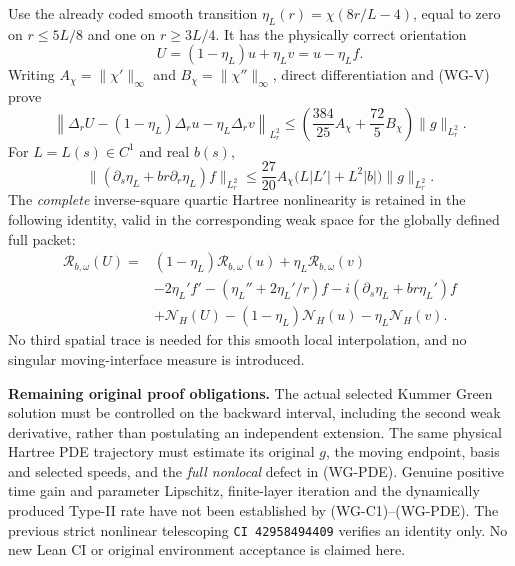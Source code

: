 Use the already coded smooth transition
$\eta_L(r)=\chi(8r/L-4)$, equal to zero on $r\le5L/8$ and one
on $r\ge3L/4$. It has the physically correct orientation
\[
 U=(1-\eta_L)u+\eta_Lv=u-\eta_Lf.
\]
Writing $A_\chi=\|\chi'\|_\infty$ and
$B_\chi=\|\chi''\|_\infty$, direct differentiation and (WG-V)
prove
\[
 \left\|\Delta_rU-(1-\eta_L)\Delta_ru-\eta_L\Delta_rv
 \right\|_{L^2_r}
 \le
 \left(\frac{384}{25}A_\chi+\frac{72}{5}B_\chi\right)
 \|g\|_{L^2_r}.
 \tag{WG-L}
\]
For $L=L(s)\in C^1$ and real $b(s)$,
\[
 \|(\partial_s\eta_L+b r\partial_r\eta_L)f\|_{L^2_r}
 \le\frac{27}{20}A_\chi
 \bigl(L|L'|+L^2|b|\bigr)\|g\|_{L^2_r}.
 \tag{WG-T}
\]
The \emph{complete} inverse-square quartic Hartree nonlinearity
is retained in the following identity, valid in the corresponding
weak space for the globally defined full packet:
\[
\begin{aligned}
 \mathcal R_{b,\omega}(U)
 ={}&(1-\eta_L)\mathcal R_{b,\omega}(u)
 +\eta_L\mathcal R_{b,\omega}(v)\\
 &-2\eta_L'f'-(\eta_L''+2\eta_L'/r)f
 -i(\partial_s\eta_L+b r\eta_L')f\\
 &+\mathcal N_H(U)-(1-\eta_L)\mathcal N_H(u)
 -\eta_L\mathcal N_H(v).
\end{aligned}
 \tag{WG-PDE}
\]
No third spatial trace is needed for this smooth local interpolation,
and no singular moving-interface measure is introduced.

\medskip
\noindent\textbf{Remaining original proof obligations.}
The actual selected Kummer Green solution must be controlled on
the backward interval, including the second weak derivative, rather
than postulating an independent extension. The same physical Hartree
PDE trajectory must estimate its original $g$, the moving endpoint,
basis and selected speeds, and the \emph{full nonlocal} defect in
(WG-PDE). Genuine positive time gain and parameter Lipschitz,
finite-layer iteration and the dynamically produced Type-II rate
have not been established by (WG-C1)--(WG-PDE).
The previous strict nonlinear telescoping
\texttt{CI~42958494409} verifies an identity only. No new Lean CI
or original environment acceptance is claimed here.
